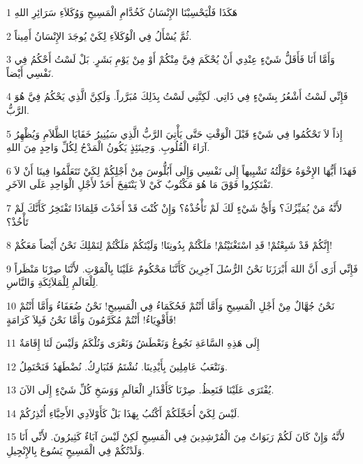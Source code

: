 \par 1 هَكَذَا فَلْيَحْسِبْنَا الإِنْسَانُ كَخُدَّامِ الْمَسِيحِ وَوُكَلاَءِ سَرَائِرِ اللهِ
\par 2 ثُمَّ يُسْأَلُ فِي الْوُكَلاَءِ لِكَيْ يُوجَدَ الإِنْسَانُ أَمِيناً.
\par 3 وَأَمَّا أَنَا فَأَقَلُّ شَيْءٍ عِنْدِي أَنْ يُحْكَمَ فِيَّ مِنْكُمْ أَوْ مِنْ يَوْمِ بَشَرٍ. بَلْ لَسْتُ أَحْكُمُ فِي نَفْسِي أَيْضاً.
\par 4 فَإِنِّي لَسْتُ أَشْعُرُ بِشَيْءٍ فِي ذَاتِي. لَكِنَّنِي لَسْتُ بِذَلِكَ مُبَرَّراً. وَلَكِنَّ الَّذِي يَحْكُمُ فِيَّ هُوَ الرَّبُّ.
\par 5 إِذاً لاَ تَحْكُمُوا فِي شَيْءٍ قَبْلَ الْوَقْتِ حَتَّى يَأْتِيَ الرَّبُّ الَّذِي سَيُنِيرُ خَفَايَا الظَّلاَمِ وَيُظْهِرُ آرَاءَ الْقُلُوبِ. وَحِينَئِذٍ يَكُونُ الْمَدْحُ لِكُلِّ وَاحِدٍ مِنَ اللهِ.
\par 6 فَهَذَا أَيُّهَا الإِخْوَةُ حَوَّلْتُهُ تَشْبِيهاً إِلَى نَفْسِي وَإِلَى أَبُلُّوسَ مِنْ أَجْلِكُمْ لِكَيْ تَتَعَلَّمُوا فِينَا أَنْ لاَ تَفْتَكِرُوا فَوْقَ مَا هُوَ مَكْتُوبٌ كَيْ لاَ يَنْتَفِخَ أَحَدٌ لأَجْلِ الْوَاحِدِ عَلَى الآخَرِ.
\par 7 لأَنَّهُ مَنْ يُمَيِّزُكَ؟ وَأَيُّ شَيْءٍ لَكَ لَمْ تَأْخُذْهُ؟ وَإِنْ كُنْتَ قَدْ أَخَذْتَ فَلِمَاذَا تَفْتَخِرُ كَأَنَّكَ لَمْ تَأْخُذْ؟
\par 8 إِنَّكُمْ قَدْ شَبِعْتُمْ! قَدِ اسْتَغْنَيْتُمْ! مَلَكْتُمْ بِدُونِنَا! وَلَيْتَكُمْ مَلَكْتُمْ لِنَمْلِكَ نَحْنُ أَيْضاً مَعَكُمْ!
\par 9 فَإِنِّي أَرَى أَنَّ اللهَ أَبْرَزَنَا نَحْنُ الرُّسُلَ آخِرِينَ كَأَنَّنَا مَحْكُومٌ عَلَيْنَا بِالْمَوْتِ. لأَنَّنَا صِرْنَا مَنْظَراً لِلْعَالَمِ لِلْمَلاَئِكَةِ وَالنَّاسِ.
\par 10 نَحْنُ جُهَّالٌ مِنْ أَجْلِ الْمَسِيحِ وَأَمَّا أَنْتُمْ فَحُكَمَاءُ فِي الْمَسِيحِ! نَحْنُ ضُعَفَاءُ وَأَمَّا أَنْتُمْ فَأَقْوِيَاءُ! أَنْتُمْ مُكَرَّمُونَ وَأَمَّا نَحْنُ فَبِلاَ كَرَامَةٍ!
\par 11 إِلَى هَذِهِ السَّاعَةِ نَجُوعُ وَنَعْطَشُ وَنَعْرَى وَنُلْكَمُ وَلَيْسَ لَنَا إِقَامَةٌ
\par 12 وَنَتْعَبُ عَامِلِينَ بِأَيْدِينَا. نُشْتَمُ فَنُبَارِكُ. نُضْطَهَدُ فَنَحْتَمِلُ.
\par 13 يُفْتَرَى عَلَيْنَا فَنَعِظُ. صِرْنَا كَأَقْذَارِ الْعَالَمِ وَوَسَخِ كُلِّ شَيْءٍ إِلَى الآنَ.
\par 14 لَيْسَ لِكَيْ أُخَجِّلَكُمْ أَكْتُبُ بِهَذَا بَلْ كَأَوْلاَدِي الأَحِبَّاءِ أُنْذِرُكُمْ.
\par 15 لأَنَّهُ وَإِنْ كَانَ لَكُمْ رَبَوَاتٌ مِنَ الْمُرْشِدِينَ فِي الْمَسِيحِ لَكِنْ لَيْسَ آبَاءٌ كَثِيرُونَ. لأَنِّي أَنَا وَلَدْتُكُمْ فِي الْمَسِيحِ يَسُوعَ بِالإِنْجِيلِ.
